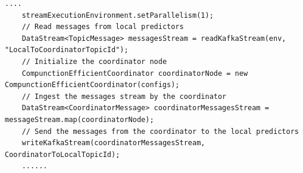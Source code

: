 \begin{lstlisting}[caption={The coordinator Flink program.},label={algonline:flink2},frame=single]
    ....	
    streamExecutionEnvironment.setParallelism(1);
	// Read messages from local predictors
	DataStream<TopicMessage> messagesStream = readKafkaStream(env, "LocalToCoordinatorTopicId");	
	// Initialize the coordinator node
	CompunctionEfficientCoordinator coordinatorNode = new CompunctionEfficientCoordinator(configs);
	// Ingest the messages stream by the coordinator	
	DataStream<CoordinatorMessage> coordinatorMessagesStream = messageStream.map(coordinatorNode);	
	// Send the messages from the coordinator to the local predictors
	writeKafkaStream(coordinatorMessagesStream, CoordinatorToLocalTopicId);
	......
\end{lstlisting}
       